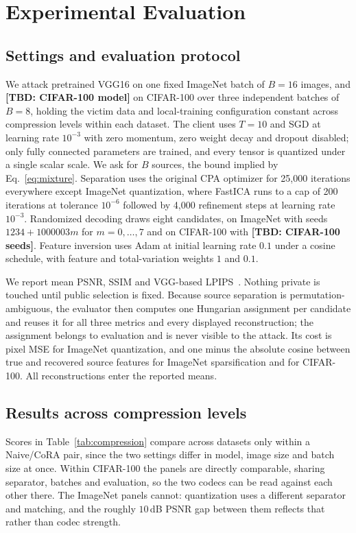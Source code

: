 \documentclass{article}
\newcommand{\cora}{CoRA}
\newcommand{\tbd}[1]{\textbf{[TBD: #1]}}
\begin{document}
\section{Experimental Evaluation}
\label{sec:experiments}
\subsection{Settings and evaluation protocol}
\label{sec:setup}
We attack pretrained VGG16 on one fixed ImageNet batch of $B=16$ images, and
\tbd{CIFAR-100 model} on CIFAR-100 over three independent batches of $B=8$,
holding the victim data and local-training configuration constant across
compression levels within each dataset. The client uses $T=10$ and SGD at
learning rate $10^{-3}$ with zero momentum, zero weight decay and dropout
disabled; only fully connected parameters are trained, and every tensor is
quantized under a single scalar scale. We ask for $B$ sources, the bound
implied by Eq.~\eqref{eq:mixture}. Separation uses the original CPA optimizer
for 25,000 iterations everywhere except ImageNet quantization, where FastICA
runs to a cap of 200 iterations at tolerance $10^{-6}$ followed by 4,000
refinement steps at learning rate $10^{-3}$. Randomized decoding draws eight
candidates, on ImageNet with seeds $1234+1000003m$ for $m=0,\ldots,7$ and on
CIFAR-100 with \tbd{CIFAR-100 seeds}. Feature inversion uses Adam at initial
learning rate $0.1$ under a cosine schedule, with feature and total-variation
weights $1$ and $0.1$.

We report mean PSNR, SSIM and VGG-based LPIPS~\cite{zhang2018lpips}. Nothing
private is touched until public selection is fixed. Because source separation
is permutation-ambiguous, the evaluator then computes one Hungarian assignment
per candidate and reuses it for all three metrics and every displayed
reconstruction; the assignment belongs to evaluation and is never visible to
the attack. Its cost is pixel MSE for ImageNet quantization, and one minus the
absolute cosine between true and recovered source features for ImageNet
sparsification and for CIFAR-100. All reconstructions enter the reported means.

\subsection{Results across compression levels}
\label{sec:bits}


Scores in Table~\ref{tab:compression} compare across datasets only within a
Naive/\cora{} pair, since the two settings differ in model, image size and
batch size at once. Within CIFAR-100 the panels are directly comparable,
sharing separator, batches and evaluation, so the two codecs can be read
against each other there. The ImageNet panels cannot: quantization uses a
different separator and matching, and the roughly $10$\,dB PSNR gap between
them reflects that rather than codec strength.
\end{document}
